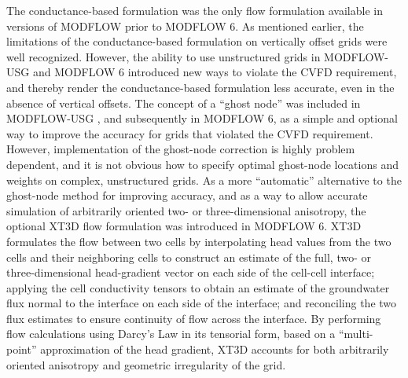\documentclass{article}
\begin{document}
The conductance-based formulation was the only flow formulation available in versions of MODFLOW prior to MODFLOW 6. As mentioned earlier, the limitations of the conductance-based formulation on vertically offset grids were well recognized. However, the ability to use unstructured grids in MODFLOW-USG and MODFLOW 6 introduced new ways to violate the CVFD requirement, and thereby render the conductance-based formulation less accurate, even in the absence of vertical offsets. The concept of a ``ghost node'' was included in MODFLOW-USG \citep{modflowusg}, and subsequently in MODFLOW 6, as a simple and optional way to improve the accuracy for grids that violated the CVFD requirement.  However, implementation of the ghost-node correction is highly problem dependent, and it is not obvious how to specify optimal ghost-node locations and weights on complex, unstructured grids.  As a more ``automatic'' alternative to the ghost-node method for improving accuracy, and as a way to allow accurate simulation of arbitrarily oriented two- or three-dimensional anisotropy, the optional XT3D flow formulation \citep{modflow6xt3d} was introduced in MODFLOW 6.  XT3D formulates the flow between two cells by interpolating head values from the two cells and their neighboring cells to construct an estimate of the full, two- or three-dimensional head-gradient vector on each side of the cell-cell interface; applying the cell conductivity tensors to obtain an estimate of the groundwater flux  normal to the interface on each side of the interface; and reconciling the two flux estimates to ensure continuity of flow across the interface. By performing flow calculations using Darcy's Law in its tensorial form, based on a ``multi-point'' approximation of the head gradient, XT3D accounts for both arbitrarily oriented anisotropy and geometric irregularity of the grid.
\end{document}
